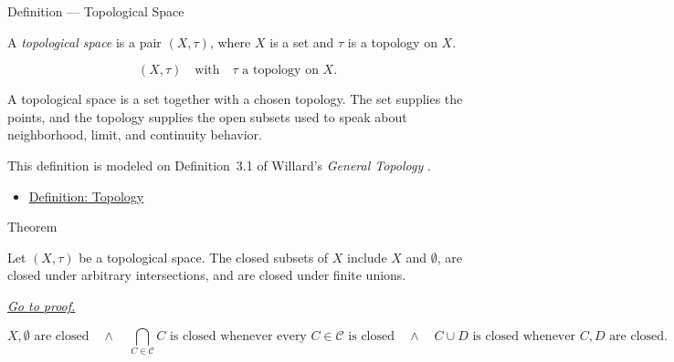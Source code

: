 \begin{definitionbox}{Definition --- Topological Space}
\begin{definition}\label{def:topological-space}
A \emph{topological space} is a pair \((X,\tau)\), where \(X\) is a set and
\(\tau\) is a topology on \(X\).
\end{definition}
\end{definitionbox}

\begin{remark*}
\[
(X,\tau)
\quad\text{with}\quad
\tau \text{ a topology on } X.
\]
\end{remark*}

\begin{remark*}[Interpretation]
A topological space is a set together with a chosen topology.  The set
supplies the points, and the topology supplies the open subsets used to speak
about neighborhood, limit, and continuity behavior.
\end{remark*}

\begin{remark*}
This definition is modeled on Definition~3.1 of Willard's
\emph{General Topology} \cite{WillardGeneralTopology}.
\end{remark*}


\begin{dependencies}
\begin{itemize}
  \item \hyperref[def:topology-on-set]{Definition: Topology}
\end{itemize}
\end{dependencies}

\begin{theorembox}{Theorem}
\begin{theorem}
\label{thm:closed-sets-in-topological-space}
Let \((X,\tau)\) be a topological space.  The closed subsets of \(X\) include
\(X\) and \(\emptyset\), are closed under arbitrary intersections, and are
closed under finite unions.

\smallskip
\noindent
\hyperref[prf:closed-sets-in-topological-space]{\textit{Go to proof.}}
\end{theorem}
\end{theorembox}

\begin{remark*}
\[
X,\emptyset\text{ are closed}
\quad\land\quad
\bigcap_{C\in\mathcal{C}}C\text{ is closed whenever every }C\in\mathcal{C}
\text{ is closed}
\quad\land\quad
C\cup D\text{ is closed whenever }C,D\text{ are closed}.
\]
\end{remark*}

